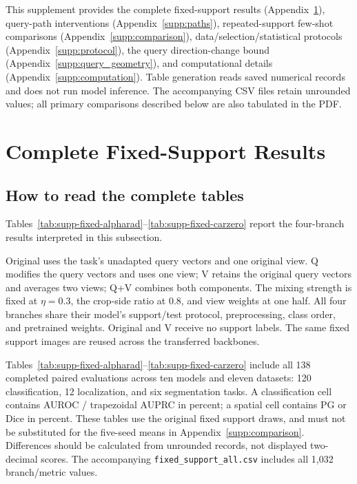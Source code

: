 \clearpage
\setcounter{page}{1}
\renewcommand{\thepage}{S\arabic{page}}
\appendix
{}
\renewcommand{\theHtable}{supp.\Alph{section}.\arabic{table}}
\renewcommand{\theHfigure}{supp.\Alph{section}.\arabic{figure}}
\maketitlesupplementary

\noindent This supplement provides the complete fixed-support results (Appendix~\ref{supp:fixed}), query-path interventions (Appendix~\ref{supp:paths}), repeated-support few-shot comparisons (Appendix~\ref{supp:comparison}), data/selection/statistical protocols (Appendix~\ref{supp:protocol}), the query direction-change bound (Appendix~\ref{supp:query_geometry}), and computational details (Appendix~\ref{supp:computation}). Table generation reads saved numerical records and does not run model inference. The accompanying CSV files retain unrounded values; all primary comparisons described below are also tabulated in the PDF.

\section{Complete Fixed-Support Results}
\label{supp:fixed}
\subsection{How to read the complete tables}
Tables~\ref{tab:supp-fixed-alpharad}--\ref{tab:supp-fixed-carzero} report the four-branch results interpreted in this subsection.

Original uses the task's unadapted query vectors and one original view. Q modifies the query vectors and uses one view; V retains the original query vectors and averages two views; Q+V combines both components. The mixing strength is fixed at $\eta=0.3$, the crop-side ratio at 0.8, and view weights at one half. All four branches share their model's support/test protocol, preprocessing, class order, and pretrained weights. Original and V receive no support labels. The same fixed support images are reused across the transferred backbones.

Tables~\ref{tab:supp-fixed-alpharad}--\ref{tab:supp-fixed-carzero} include all 138 completed paired evaluations across ten models and eleven datasets: 120 classification, 12 localization, and six segmentation tasks. A classification cell contains AUROC / trapezoidal AUPRC in percent; a spatial cell contains PG or Dice in percent. These tables use the original fixed support draws, and must not be substituted for the five-seed means in Appendix~\ref{supp:comparison}. Differences should be calculated from unrounded records, not displayed two-decimal scores. The accompanying \texttt{fixed\_support\_all.csv} includes all 1,032 branch/metric values.

